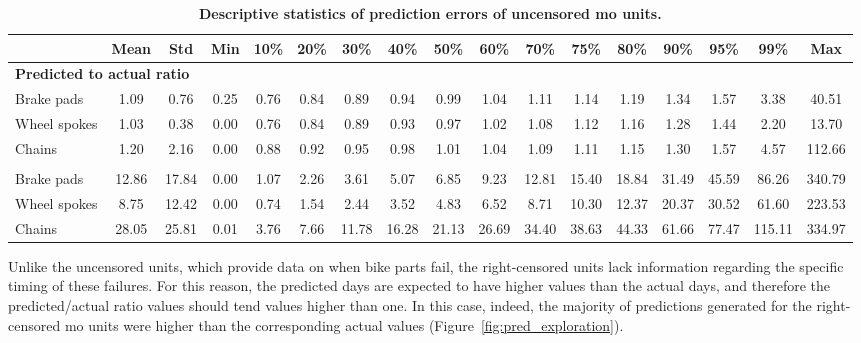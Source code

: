         \begin{table}
            \centering
            \footnotesize
            \caption[Descriptive statistics of prediction errors of uncensored MO units]{
                \textbf{Descriptive statistics of prediction errors of uncensored \ac{mo} units.}
            }
            \label{tab:pred_actual_statistics}
            \begin{tabular}{
                lcccccccccccccccc
            }
            \toprule
                            & {Mean} & {Std} & {Min} & {10\%} & {20\%} & {30\%} & {40\%} & {50\%} & {60\%} & {70\%} & {75\%} & {80\%} & {90\%} & {95\%} & {99\%} & {Max}    \\
            \midrule
            \multicolumn{17}{l}{\textbf{Predicted to actual ratio}} \\
            Brake pads   & 1.09  & 0.76  & 0.25 & 0.76 & 0.84 & 0.89  & 0.94  & 0.99  & 1.04  & 1.11  & 1.14  & 1.19  & 1.34  & 1.57  & 3.38   & 40.51  \\
            Wheel spokes & 1.03  & 0.38  & 0.00 & 0.76 & 0.84 & 0.89  & 0.93  & 0.97  & 1.02  & 1.08  & 1.12  & 1.16  & 1.28  & 1.44  & 2.20   & 13.70  \\
            Chains       & 1.20  & 2.16  & 0.00 & 0.88 & 0.92 & 0.95  & 0.98  & 1.01  & 1.04  & 1.09  & 1.11  & 1.15  & 1.30  & 1.57  & 4.57   & 112.66 \\
            \addlinespace
            \multicolumn{17}{l}{\textbf{Predicted minus actual}} \\
            Brake pads   & 12.86 & 17.84 & 0.00 & 1.07 & 2.26 & 3.61  & 5.07  & 6.85  & 9.23  & 12.81 & 15.40 & 18.84 & 31.49 & 45.59 & 86.26  & 340.79 \\
            Wheel spokes & 8.75  & 12.42 & 0.00 & 0.74 & 1.54 & 2.44  & 3.52  & 4.83  & 6.52  & 8.71  & 10.30 & 12.37 & 20.37 & 30.52 & 61.60  & 223.53 \\
            Chains       & 28.05 & 25.81 & 0.01 & 3.76 & 7.66 & 11.78 & 16.28 & 21.13 & 26.69 & 34.40 & 38.63 & 44.33 & 61.66 & 77.47 & 115.11 & 334.97 \\
            \bottomrule
            \end{tabular}  
        \end{table}

    Unlike the uncensored units, which provide data on when bike parts fail, the right-censored units lack information regarding the specific timing of these failures. For this reason, the predicted days are expected to have higher values than the actual days, and therefore the predicted/actual ratio values should tend values higher than one. In this case, indeed, the majority of predictions generated for the right-censored \ac{mo} units were higher than the corresponding actual values (Figure~\ref{fig:pred_exploration}).

